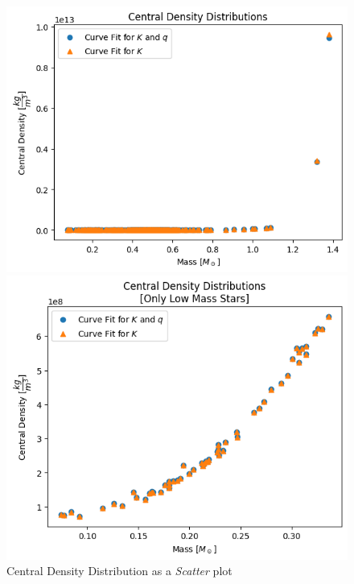 \documentclass[letterpaper,12pt]{article}
\begin{document}
\begin{figure}[H]
\begin{minipage}{.5\textwidth}
\centerline{\includegraphics[width=\linewidth]{figures/appendix/2_2_3_n_s_rho_m.png}}
\end{minipage}
\begin{minipage}{.5\textwidth}
\centerline{\includegraphics[width=\linewidth]{figures/appendix/2_2_4_n_s_rho_m_.png}}
\end{minipage}
\caption{Central Density Distribution as a \textit{Scatter} plot}
\end{figure}
\end{document}
